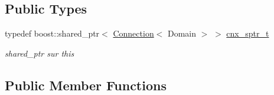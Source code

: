 \subsection*{Public Types}
\begin{DoxyCompactItemize}
\item 
typedef boost\+::shared\+\_\+ptr$<$ \hyperlink{classxtd_1_1network_1_1base_1_1Connection}{Connection}$<$ Domain $>$ $>$ \hyperlink{classxtd_1_1network_1_1base_1_1Connection_a10f05cd689d67b012768c79486c6df47}{cnx\+\_\+sptr\+\_\+t}
\begin{DoxyCompactList}\small\item\em shared\+\_\+ptr sur this \end{DoxyCompactList}\end{DoxyCompactItemize}
\subsection*{Public Member Functions}
